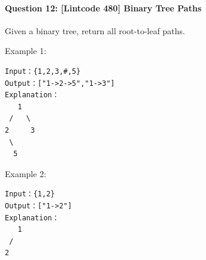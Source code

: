 \documentclass[11pt]{article}
\begin{document}
    \paragraph{Question 12: {[}Lintcode 480{]} Binary Tree
Paths}\label{question-12-lintcode-480-binary-tree-paths}

Given a binary tree, return all root-to-leaf paths.

Example 1:

\begin{verbatim}
Input：{1,2,3,#,5}
Output：["1->2->5","1->3"]
Explanation：
   1
 /   \
2     3
 \
  5
\end{verbatim}

Example 2:

\begin{verbatim}
Input：{1,2}
Output：["1->2"]
Explanation：
   1
 /   
2  
\end{verbatim}
\end{document}
